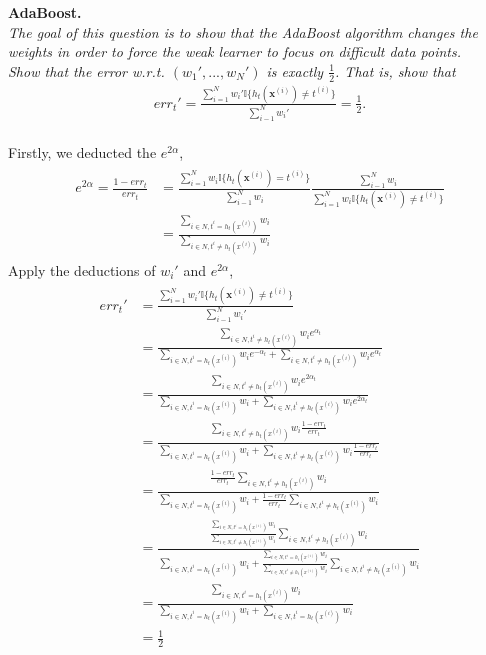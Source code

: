 \documentclass{myhw}
\begin{document}
\begin{homeworkProblem}
\textbf{AdaBoost.} \\
\emph{The goal of this question is to show that the AdaBoost algorithm changes the weights in order to force the weak learner to focus on difficult data points.} \\
\emph{Show that the error w.r.t. $(w_1',...,w_N')$ is exactly $\frac{1}{2}$. That is, show that}
\begin{gather*}
err_t' = \frac{\sum_{i=1}^N w_i' \mathbb{I} \{h_t(\textbf{x}^{(i)}) \neq t^{(i)} \} }{\sum_{i-1}^{N} w_i'} = \frac{1}{2}.
\end{gather*}
\\
Firstly, we deducted the $e^{2\alpha}$, 
\begin{gather*}
\begin{aligned}
e^{2\alpha} = \frac{1 - err_t}{err_t} 
& = \frac{\sum_{i=1}^N w_i \mathbb{I} \{h_t(\textbf{x}^{(i)}) = t^{(i)} \} }{\sum_{i-1}^{N} w_i} \frac{\sum_{i-1}^{N} w_i}{\sum_{i=1}^N w_i \mathbb{I} \{h_t(\textbf{x}^{(i)}) \neq t^{(i)} \} } \\
& = \frac{\sum_{i \in N, t^i = h_t(x^{(i)})} w_i }{\sum_{i \in N, t^i \neq h_t(x^{(i)})} w_i }
\end{aligned}
\end{gather*}
Apply the deductions of $w_i'$ and $e^{2\alpha}$, 
\begin{gather*}
\begin{aligned}
err_t' & = \frac{\sum_{i=1}^N w_i' \mathbb{I} \{h_t(\textbf{x}^{(i)}) \neq t^{(i)} \} }{\sum_{i-1}^{N} w_i'} \\
& = \frac{\sum_{i \in N, t^i \neq h_t(x^{(i)})} w_i e^{\alpha_t}}{\sum_{i \in N, t^i = h_t(x^{(i)})} w_i e^{-\alpha_t} + \sum_{i \in N, t^i \neq h_t(x^{(i)})} w_i e^{\alpha_t}} \\
& = \frac{\sum_{i \in N, t^i \neq h_t(x^{(i)})} w_i e^{2\alpha_t} }{\sum_{i \in N, t^i = h_t(x^{(i)})} w_i + \sum_{i \in N, t^i \neq h_t(x^{(i)})} w_i e^{2\alpha_t}} \\
& = \frac{\sum_{i \in N, t^i \neq h_t(x^{(i)})} w_i \frac{1 - err_t}{err_t} }{\sum_{i \in N, t^i = h_t(x^{(i)})} w_i + \sum_{i \in N, t^i \neq h_t(x^{(i)})} w_i \frac{1 - err_t}{err_t} } \\
& = \frac{\frac{1 - err_t}{err_t} \sum_{i \in N, t^i \neq h_t(x^{(i)})} w_i }{\sum_{i \in N, t^i = h_t(x^{(i)})} w_i + \frac{1 - err_t}{err_t}  \sum_{i \in N, t^i \neq h_t(x^{(i)})} w_i } \\
& = \frac{\frac{\sum_{i \in N, t^i = h_t(x^{(i)})} w_i }{\sum_{i \in N, t^i \neq h_t(x^{(i)})} w_i } \sum_{i \in N, t^i \neq h_t(x^{(i)})} w_i }{\sum_{i \in N, t^i = h_t(x^{(i)})} w_i + \frac{\sum_{i \in N, t^i = h_t(x^{(i)})} w_i }{\sum_{i \in N, t^i \neq h_t(x^{(i)})} w_i }  \sum_{i \in N, t^i \neq h_t(x^{(i)})} w_i } \\
& = \frac{\sum_{i \in N, t^i = h_t(x^{(i)})} w_i}{\sum_{i \in N, t^i = h_t(x^{(i)})} w_i + \sum_{i \in N, t^i = h_t(x^{(i)})} w_i} \\
& = \frac{1}{2}
\end{aligned}
\end{gather*}

\end{homeworkProblem}
\end{document}

